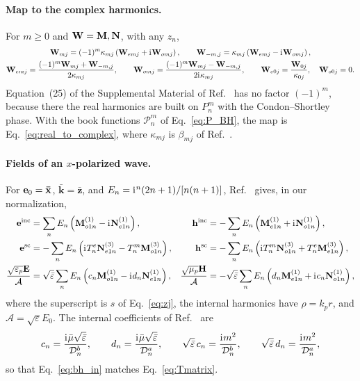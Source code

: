 \documentclass[
    pra,
    aps,
    reprint,
    onecolumn,
    amsmath,amssymb,
    a4paper,
    superscriptaddress,
    10pt,
    nofootinbib
]{revtex4-2}
\newcommand{\iu}{\mathrm{i}\mkern1mu}                 %
\newcommand{\ort}[1]{\boldsymbol{\mathbf{\bar{#1}}}}  %
\newcommand{\eb}{\bar{\varepsilon}}
\newcommand{\mb}{\bar{\mu}}
\begin{document}
\paragraph{Map to the complex harmonics.}
For $m \geq 0$ and $\vb{W} = \vb{M}, \vb{N}$, with any $z_n$,
\begin{gather}
    \vb{W}_{mj} = (-1)^m\kappa_{mj}\left(\vb{W}_{emj} + \iu\vb{W}_{omj}\right), \qquad
    \vb{W}_{-m,j} = \kappa_{mj}\left(\vb{W}_{emj} - \iu\vb{W}_{omj}\right),
    \label{eq:real_to_complex}
    \\
    \vb{W}_{emj} = \frac{(-1)^m\vb{W}_{mj} + \vb{W}_{-m,j}}{2\kappa_{mj}}, \qquad
    \vb{W}_{omj} = \frac{(-1)^m\vb{W}_{mj} - \vb{W}_{-m,j}}{2\iu\kappa_{mj}}, \qquad
    \vb{W}_{e0j} = \frac{\vb{W}_{0j}}{\kappa_{0j}}, \quad \vb{W}_{o0j} = 0 .
    \label{eq:complex_to_real}
\end{gather}
Equation~(25) of the Supplemental Material of Ref.~\cite{Toftul2023PRL} has no factor $(-1)^m$, because there the real harmonics are built on $P_n^m$ with the Condon--Shortley phase.
With the book functions $\mathcal{P}_n^m$ of Eq.~\eqref{eq:P_BH}, the map is Eq.~\eqref{eq:real_to_complex}, where $\kappa_{mj}$ is $\beta_{mj}$ of Ref.~\cite{Toftul2023PRL}.

\paragraph{Fields of an $x$-polarized wave.}
For $\vb{e}_0 = \ort{x}$, $\ort{k} = \ort{z}$, and $E_n = \iu^n(2n+1)/[n(n+1)]$, Ref.~\cite[Ch.~4]{Bohren1984} gives, in our normalization,
\begin{align}
    \vb{e}^{\rm inc} &= \sum_n E_n\left(\vb{M}^{(1)}_{o1n} - \iu\vb{N}^{(1)}_{e1n}\right), &
    \vb{h}^{\rm inc} &= -\sum_n E_n\left(\vb{M}^{(1)}_{e1n} + \iu\vb{N}^{(1)}_{o1n}\right), \label{eq:bh_pw} \\
    \vb{e}^{\rm sc} &= -\sum_n E_n\left(\iu T^e_n\vb{N}^{(3)}_{e1n} - T^m_n\vb{M}^{(3)}_{o1n}\right), &
    \vb{h}^{\rm sc} &= -\sum_n E_n\left(\iu T^m_n\vb{N}^{(3)}_{o1n} + T^e_n\vb{M}^{(3)}_{e1n}\right), \label{eq:bh_sc} \\
    \frac{\sqrt{\varepsilon_p}\vb{E}}{\mathcal{A}} &= \sqrt{\eb}\sum_n E_n\left(c_n\vb{M}^{(1)}_{o1n} - \iu d_n\vb{N}^{(1)}_{e1n}\right), &
    \frac{\sqrt{\mu_p}\vb{H}}{\mathcal{A}} &= -\sqrt{\eb}\sum_n E_n\left(d_n\vb{M}^{(1)}_{e1n} + \iu c_n\vb{N}^{(1)}_{o1n}\right), \label{eq:bh_in}
\end{align}
where the superscript is $s$ of Eq.~\eqref{eq:zj}, the internal harmonics have $\rho = k_p r$, and $\mathcal{A} = \sqrt{\varepsilon}E_0$.
The internal coefficients of Ref.~\cite{Bohren1984} are
\begin{equation}
    c_n = \frac{\iu\mb\sqrt{\eb}}{\mathcal{D}^b_n}, \qquad
    d_n = \frac{\iu\mb\sqrt{\eb}}{\mathcal{D}^a_n}, \qquad
    \sqrt{\eb}\, c_n = \frac{\iu m^2}{\mathcal{D}^b_n}, \qquad
    \sqrt{\eb}\, d_n = \frac{\iu m^2}{\mathcal{D}^a_n},
    \label{eq:cd}
\end{equation}
so that Eq.~\eqref{eq:bh_in} matches Eq.~\eqref{eq:Tmatrix}.
\end{document}
